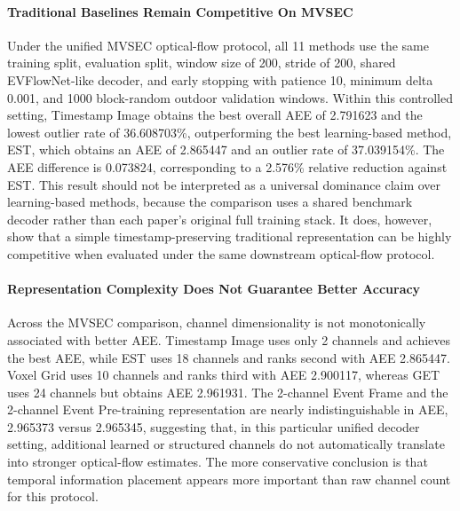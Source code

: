 \documentclass[11pt]{article}
\begin{document}
\paragraph{Traditional Baselines Remain Competitive On MVSEC} Under the unified MVSEC optical-flow protocol, all 11 methods use the same training split, evaluation split, window size of 200, stride of 200, shared EVFlowNet-like decoder, and early stopping with patience 10, minimum delta 0.001, and 1000 block-random outdoor validation windows. Within this controlled setting, Timestamp Image obtains the best overall AEE of 2.791623 and the lowest outlier rate of 36.608703\%, outperforming the best learning-based method, EST, which obtains an AEE of 2.865447 and an outlier rate of 37.039154\%. The AEE difference is 0.073824, corresponding to a 2.576\% relative reduction against EST. This result should not be interpreted as a universal dominance claim over learning-based methods, because the comparison uses a shared benchmark decoder rather than each paper's original full training stack. It does, however, show that a simple timestamp-preserving traditional representation can be highly competitive when evaluated under the same downstream optical-flow protocol.

\paragraph{Representation Complexity Does Not Guarantee Better Accuracy} Across the MVSEC comparison, channel dimensionality is not monotonically associated with better AEE. Timestamp Image uses only 2 channels and achieves the best AEE, while EST uses 18 channels and ranks second with AEE 2.865447. Voxel Grid uses 10 channels and ranks third with AEE 2.900117, whereas GET uses 24 channels but obtains AEE 2.961931. The 2-channel Event Frame and the 2-channel Event Pre-training representation are nearly indistinguishable in AEE, 2.965373 versus 2.965345, suggesting that, in this particular unified decoder setting, additional learned or structured channels do not automatically translate into stronger optical-flow estimates. The more conservative conclusion is that temporal information placement appears more important than raw channel count for this protocol.
\end{document}
